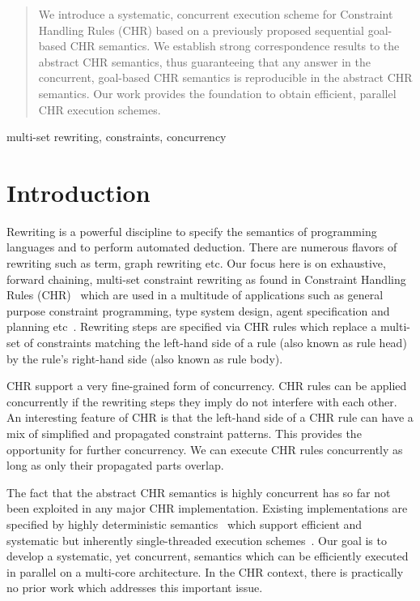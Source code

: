 \documentclass{tlp}
\begin{document}
\maketitle

\label{firstpage}

\begin{abstract}
We introduce a systematic, concurrent execution scheme for 
Constraint Handling Rules (CHR) based on a previously proposed
sequential goal-based CHR semantics. We establish strong correspondence results to 
the abstract CHR semantics, thus guaranteeing that any answer in the 
concurrent, goal-based CHR semantics is reproducible
in the abstract CHR semantics.
Our work provides the foundation to obtain efficient, parallel CHR execution
schemes.
\end{abstract}
\begin{keywords}
 multi-set rewriting, constraints, concurrency
\end{keywords}






\section{Introduction}

Rewriting is a powerful discipline to specify the semantics of programming languages
and to perform automated deduction. There are numerous flavors of rewriting
such as term, graph rewriting etc. Our focus here is on
exhaustive, forward chaining, multi-set constraint rewriting as 
found in Constraint Handling Rules (CHR)~\cite{fruehwirth98:chr:art}
which are used in a multitude of applications such as
general purpose constraint programming,
type system design, agent specification and planning etc~\cite{1140337}.
Rewriting steps are specified via CHR rules which replace
a multi-set of constraints matching the left-hand side of a rule (also known as rule head) by
the rule's right-hand side (also known as rule body).

CHR support a very fine-grained form of concurrency.
CHR rules can be applied concurrently
if the rewriting steps they imply do not interfere with each other.
An interesting feature of CHR is that
the left-hand side of  a CHR rule
can have a mix of simplified and propagated constraint patterns.
This provides the opportunity for further concurrency. We can execute CHR rules
concurrently as long as only their propagated parts overlap.

The fact that the abstract CHR semantics is highly concurrent 
has so far not been exploited in any major CHR implementation.
Existing implementations are specified by 
highly deterministic semantics~\cite{DuckSBH04,rp-chr} which
support efficient and systematic but inherently 
single-threaded execution schemes~\cite{greg:thesis,DBLP:conf/iclp/Schrijvers05}.
Our goal is to develop a systematic, yet concurrent, semantics which can
be efficiently executed in parallel on a multi-core architecture.
In the CHR context, there is practically no prior work which addresses this important
issue.
\end{document}
